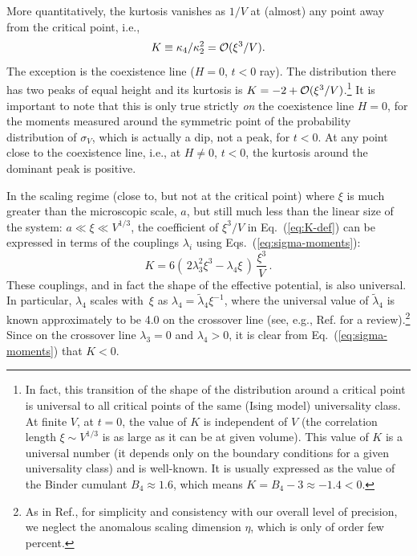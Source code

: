 \documentclass[prl,twocolumn,nofootinbib]{revtex4}
\newcommand\cO{{\cal O}}
\begin{document}
More quantitatively, the kurtosis vanishes as $1/V$ at (almost) any
point away from the critical point, i.e.,
\begin{equation}
  \label{eq:K-def}
  K\equiv
\kappa_4/\kappa_2^2=\cO(\xi^3/V).
\end{equation}
The exception is the coexistence line ($H=0$, $t<0$ ray). The
distribution there has two peaks of equal height and its kurtosis is
$K=-2+\cO(\xi^3/V)$.\footnote{ In fact, this transition of the shape
  of the distribution around a critical point is universal to all
  critical points of the same (Ising model) universality class. At
  finite $V$, at $t=0$, the value of $K$ is independent of $V$ (the
  correlation length $\xi\sim V^{1/3}$ is as large as it can be at
  given volume). This value of $K$ is a universal number (it depends
  only on the boundary conditions for a given universality class) and
  is well-known. It is usually expressed as the value of the Binder
  cumulant $B_4\approx 1.6$, which means $K=B_4-3\approx -1.4<0$.} 
%
It is important to note that this is only true strictly {\em on\/} the
coexistence line $H=0$, for the moments
measured around the symmetric point of the probability distribution of
$\sigma_V$, which is actually a dip, not a peak, for $t<0$. At any
point close to the coexistence line, i.e., at $H\neq 0$, $t<0$, the
kurtosis around the dominant peak is positive.

In the scaling regime  (close to, but not 
at the critical point) where  $\xi$ is much greater than the
microscopic scale, $a$, but still much less than the linear size of the system:
$a\ll \xi\ll V^{1/3}$, the coefficient of $\xi^3/V$ in
Eq.~(\ref{eq:K-def}) can be expressed in terms of the
couplings $\lambda_i$ using Eqs.~(\ref{eq:sigma-moments}): 
\begin{equation}
  \label{eq:K-lambda}
  K = 6\left(\,2\lambda_3^2\xi^3-\lambda_4\xi\,\right)\,\frac{\xi^3}{V}\,.
\end{equation}
These
couplings, and in fact the shape of the effective potential, is also
universal. In particular, $\lambda_4$
scales with~$\xi$ as 
$\lambda_4=\tilde\lambda_4\xi^{-1}$, where the universal value of
$\tilde\lambda_4$ is known approximately to be 4.0 on the crossover
line (see, e.g.,
Ref.\cite{Tsypin} for a review).\footnote{As in Ref.\cite{Stephanov:2008qz}, for
  simplicity and consistency with our overall level of precision, we neglect the anomalous scaling dimension $\eta$, which
  is only of order few percent.} Since on the
crossover line $\lambda_3=0$ and $\lambda_4>0$, 
it is clear from Eq.~(\ref{eq:sigma-moments}) that $K<0$. 
\end{document}
